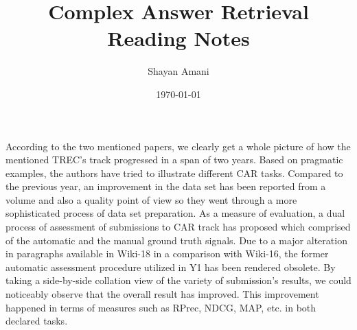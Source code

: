 \documentclass[a4paper,12pt]{article}
\title{Complex Answer Retrieval \\{\large Reading Notes}}
\author{Shayan Amani}
\date{\today}
\begin{document}
\maketitle

According to the two mentioned papers, we clearly get a whole picture of how the mentioned TREC's track progressed in a span of two years. Based on pragmatic examples, the authors have tried to illustrate different CAR tasks. Compared to the previous year, an improvement in the data set has been reported from a volume and also a quality point of view so they went through a more sophisticated process of data set preparation. As a measure of evaluation, a dual process of assessment of submissions to CAR track has proposed which comprised of the automatic and the manual ground truth signals. Due to a major alteration in paragraphs available in Wiki-18 in a comparison with Wiki-16, the former automatic assessment procedure utilized in Y1 has been rendered obsolete. By taking a side-by-side collation view of the variety of submission's results, we could noticeably observe that the overall result has improved. This improvement happened in terms of measures such as RPrec, NDCG, MAP, etc. in both declared tasks. 
\end{document}
